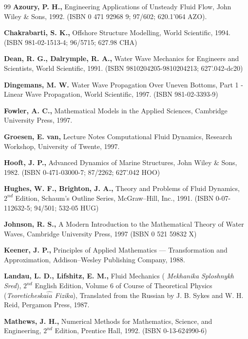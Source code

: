 \documentclass[12pt,a4paper]{report}
\begin{document}
\begin{thebibliography}{99}
  \textbf{Azoury, P. H.,} Engineering Applications of Unsteady
Fluid Flow, John Wiley \& Sons, 1992. (ISBN 0 471 92968 9; 97/602; 620.1'064
AZO). 

  \textbf{Chakrabarti, S. K.,} Offshore Structure Modelling,
World Scientific, 1994. (ISBN 981-02-1513-4; 96/5715; 627.98 CHA)

  \textbf{Dean, R. G., Dalrymple, R. A.,} Water Wave Mechanics
for Engineers and Scientists, World Scientific, 1991. (ISBN
9810204205-9810204213; 627'.042-dc20)

  \textbf{Dingemans, M. W.} Water Wave Propagation Over Uneven
Bottoms, Part 1 - Linear Wave Propagation, World Scientific, 1997. (ISBN
981-02-3393-9)

  \textbf{Fowler, A. C., } Mathematical Models in the Applied
Sciences, Cambridge University Press, 1997.

  \textbf{Groesen, E. van,} Lecture Notes Computational Fluid
Dynamics, Research Workshop, University of Twente, 1997.

  \textbf{Hooft, J. P.,} Advanced Dynamics of Marine
Structures, John Wiley \& Sons, 1982. (ISBN 0-471-03000-7; 87/2262; 627'.042
HOO)

  \textbf{Hughes, W. F., Brighton, J. A.,} Theory and Problems
of Fluid Dynamics, $2^{nd}$ Edition, Schaum's Outline Series, McGraw--Hill,
Inc., 1991. (ISBN 0-07-112632-5; 94/501; 532-05 HUG)

  \textbf{Johnson, R. S.,} A Modern Introduction to the
Mathematical Theory of Water Waves, Cambridge University Press, 1997 (ISBN 0
521 59832 X)

  \textbf{Keener, J. P.,} Principles of Applied Mathematics ---
Transformation and Approximation, Addison--Wesley Publishing Company, 1988.

  \textbf{Landau, L. D., Lifshitz, E. M.,} Fluid Mechanics (%
\textit{Mekhanika Sploshnykh Sred}), $2^{nd}$ English Edition, Volume 6 of
Course of Theoretical Physics (\textit{Teoreticheska$\widehat{ia}$ Fizika}),
Translated from the Russian by J. B. Sykes and W. H. Reid, Pergamon Press,
1987.

  \textbf{Mathews, J. H.,} Numerical Methods for Mathematics,
Science, and Engineering, $2^{nd}$ Edition, Prentice Hall, 1992. (ISBN
0-13-624990-6)


\end{thebibliography}
\end{document}
